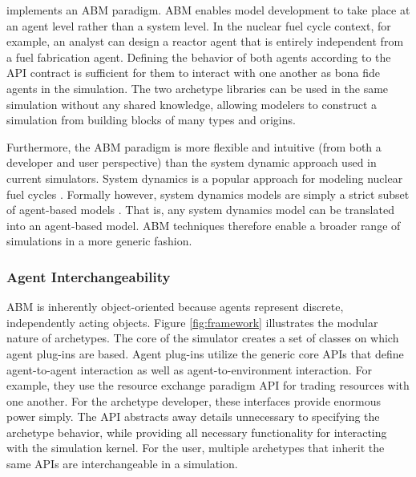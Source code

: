 \Cyclus implements an \acrlong{ABM} paradigm. \gls{ABM} enables model
development to take place at an agent level rather than a system level. In the
nuclear fuel cycle context, for example, an analyst can design a reactor agent
that is entirely independent from a fuel fabrication agent. Defining the
behavior of both agents according to the
\gls{API} contract is sufficient for them to interact with one another as
bona fide agents in the simulation.  The two archetype libraries can be used in
the same simulation without any shared knowledge, allowing modelers to
construct a simulation from building blocks of many types and origins.

Furthermore, the \gls{ABM} paradigm is more flexible and intuitive (from both a developer and user perspective) than the system dynamic approach used in current simulators.
System dynamics is a popular approach for modeling nuclear fuel cycles
\cite{jacobson_vision_2009,van_den_durpel_daness_2009,guerin_impact_2009,guerin_benchmark_2009}.
Formally however, system dynamics models are simply a strict subset of agent-based models
\cite{macal_agent-based_2010}.
That is, any system dynamics model can be translated
into an agent-based model.
\gls{ABM} techniques therefore enable a broader range of simulations in a more
generic fashion.

\subsubsection{Agent Interchangeability}\label{sec:interchangeability}


\gls{ABM} is inherently object-oriented because agents represent discrete,
independently acting objects.  Figure \ref{fig:framework} illustrates the
modular nature of \Cyclus archetypes.  The core of the \Cyclus simulator creates
a set of classes on which agent plug-ins are based.  Agent plug-ins utilize the
generic core \glspl{API} that define agent-to-agent interaction as well as agent-to-environment interaction.
For example, they use the
resource exchange paradigm \gls{API} for trading resources with one another.  
For the archetype developer, these interfaces provide enormous power
simply. The \gls{API} abstracts away details unnecessary to specifying the 
archetype behavior, while providing
all necessary functionality for interacting with the \Cyclus simulation kernel.
For the user, multiple archetypes that inherit the same \glspl{API} are interchangeable
in a simulation.

